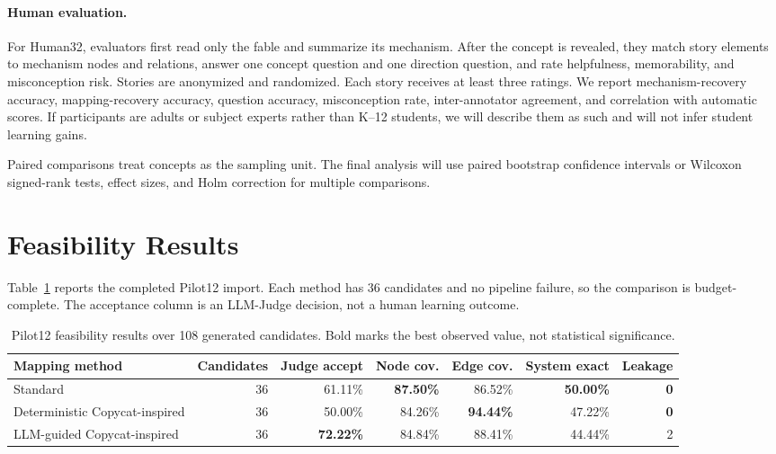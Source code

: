 \documentclass[letterpaper]{article} %
\begin{document}
\paragraph{Human evaluation.}
For Human32, evaluators first read only the fable and summarize its mechanism. After the concept is revealed, they match story elements to mechanism nodes and relations, answer one concept question and one direction question, and rate helpfulness, memorability, and misconception risk. Stories are anonymized and randomized. Each story receives at least three ratings. We report mechanism-recovery accuracy, mapping-recovery accuracy, question accuracy, misconception rate, inter-annotator agreement, and correlation with automatic scores. If participants are adults or subject experts rather than K--12 students, we will describe them as such and will not infer student learning gains.

Paired comparisons treat concepts as the sampling unit. The final analysis will use paired bootstrap confidence intervals or Wilcoxon signed-rank tests, effect sizes, and Holm correction for multiple comparisons.

\section{Feasibility Results}

Table~\ref{tab:pilot} reports the completed Pilot12 import. Each method has 36 candidates and no pipeline failure, so the comparison is budget-complete. The acceptance column is an LLM-Judge decision, not a human learning outcome.

\begin{table}[t]
\centering
\small
\begin{tabular}{lrrrrrr}
\toprule
Mapping method & Candidates & Judge accept & Node cov. & Edge cov. & System exact & Leakage \\
\midrule
Standard & 36 & 61.11\% & \textbf{87.50\%} & 86.52\% & \textbf{50.00\%} & \textbf{0} \\
Deterministic Copycat-inspired & 36 & 50.00\% & 84.26\% & \textbf{94.44\%} & 47.22\% & \textbf{0} \\
LLM-guided Copycat-inspired & 36 & \textbf{72.22\%} & 84.84\% & 88.41\% & 44.44\% & 2 \\
\bottomrule
\end{tabular}
\caption{Pilot12 feasibility results over 108 generated candidates. Bold marks the best observed value, not statistical significance.}
\label{tab:pilot}
\end{table}
\end{document}
